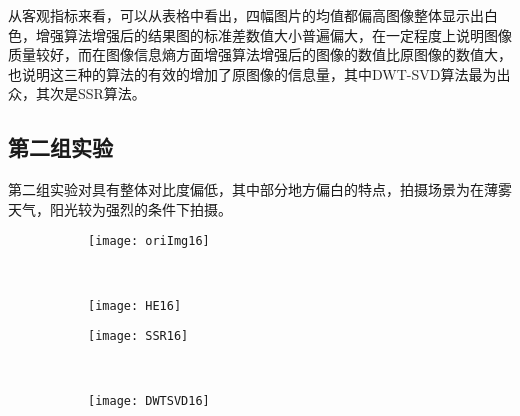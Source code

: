 \begin{table}[!htbp]
    \label{tab:sample}
    \centering
    \footnotesize%
    \setlength{\tabcolsep}{4pt}%
    \renewcommand{\arraystretch}{1.2}%
    
\end{table}


从客观指标来看，可以从表格中看出，四幅图片的均值都偏高图像整体显示出白色，增强算法增强后的结果图的标准差数值大小普遍偏大，在一定程度上说明图像质量较好，而在图像信息熵方面增强算法增强后的图像的数值比原图像的数值大，也说明这三种的算法的有效的增加了原图像的信息量，其中DWT-SVD算法最为出众，其次是SSR算法。

			\subsection{第二组实验}第二组实验对具有整体对比度偏低，其中部分地方偏白的特点，拍摄场景为在薄雾天气，阳光较为强烈的条件下拍摄。


\begin{figure}[!htbp]
    \centering
    \begin{subfigure}[b]{0.5\textwidth}
      \texttt{[image: oriImg16]}
      \caption{}
      \label{fig:oaspl_a}
    \end{subfigure}%
    ~%
    \begin{subfigure}[b]{0.5\textwidth}
      \texttt{[image: HE16]}
      \caption{}
      \label{fig:oaspl_b}
    \end{subfigure}
    \begin{subfigure}[b]{0.5\textwidth}
      \texttt{[image: SSR16]}
      \caption{}
      \label{fig:oaspl_c}
    \end{subfigure}%
    ~%
    \begin{subfigure}[b]{0.5\textwidth}
      \texttt{[image: DWTSVD16]}
      \caption{}
      \label{fig:oaspl_d}
    \end{subfigure}
    \label{fig:oaspl}
\end{figure}

